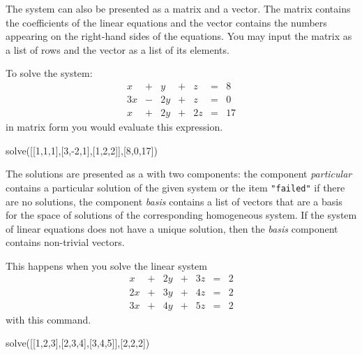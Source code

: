 {{{{{{{{{{{{The system can also be presented as a matrix and a vector.
The matrix contains the coefficients of the linear equations and
the vector contains the numbers appearing on the right-hand sides
of the equations.
You may input the matrix as a list of rows and the vector as a
list of its elements.

\begin{xtc}
\begin{xtccomment}
To solve the system:
$$
\begin{array}{rcrcrcr}
  x&+&  y&+&  z&=&8  \\
3 x&-&2 y&+&  z&=&0  \\
  x&+&2 y&+&2 z&=&17
\end{array}
$$
in matrix form you would evaluate this expression.
\end{xtccomment}
\begin{spadsrc}
solve([[1,1,1],[3,-2,1],[1,2,2]],[8,0,17])
\end{spadsrc}
\begin{TeXOutput}
\begin{fricasmath}{3}
%
\end{fricasmath}
\end{TeXOutput}
\end{xtc}

The solutions are presented as a  with two
components: the component
{\it particular}
contains a particular solution of the given system or
the item {\tt "failed"} if there are no solutions, the component
{\it basis} contains a list of vectors that
are a basis for the space of solutions of the corresponding
homogeneous system.
If the system of linear equations does not have a unique solution,
then the {\it basis} component contains
non-trivial vectors.

\begin{xtc}
\begin{xtccomment}
This happens when you solve the linear system
$$
\begin{array}{rcrcrcr}
  x&+&2 y&+&3 z&=&2 \\
2 x&+&3 y&+&4 z&=&2 \\
3 x&+&4 y&+&5 z&=&2
\end{array}
$$
with this command.
\end{xtccomment}
\begin{spadsrc}
solve([[1,2,3],[2,3,4],[3,4,5]],[2,2,2])
\end{spadsrc}
\begin{TeXOutput}
\begin{fricasmath}{4}
%
\end{fricasmath}
\end{TeXOutput}
\end{xtc}

}}}}}}}}}}}}
